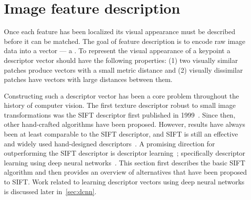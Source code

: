 \section{Image feature description}\label{sec:featuredescribe}  

    Once each feature has been localized its visual appearance must be described before it can be matched. The goal
    of feature description is to encode raw image data into a vector --- \ie{} a . To
    represent the visual appearance of a keypoint a descriptor vector should have the following properties: (1) two
    visually similar patches produce vectors with a small metric distance and (2) visually dissimilar patches have
    vectors with large distances between them.

    Constructing such a descriptor vector has been a core problem throughout the history of computer vision. The
    first texture descriptor robust to small image transformations was the SIFT descriptor first published in
    1999~\cite{lowe_object_1999, lowe_distinctive_2004}. Since then, other hand-crafted algorithms have been
    proposed. However, results have always been at least comparable to the SIFT descriptor, and SIFT is still an
    effective and widely used hand-designed descriptors~\cite{mikolajczyk_performance_2005, calonder_brief_2010,
    bay_surf_2006, leutenegger_brisk_2011, alahi_freak_2012, jegou_triangulation_2014}. A promising direction for
    outperforming the SIFT descriptor is descriptor learning~\cite{simonyan_descriptor_2012,
    simonyan_learning_2014, winder_picking_2009}; specifically descriptor learning using deep neural
    networks~\cite{razavian_cnn_2014, bengio_representation_2013, russakovsky_imagenet_2014}. This section first
    describes the basic SIFT algorithm and then provides an overview of alternatives that have been proposed to
    SIFT{}. Work related to learning descriptor vectors using deep neural networks is discussed later
    in~\cref{sec:dcnn}.
      
